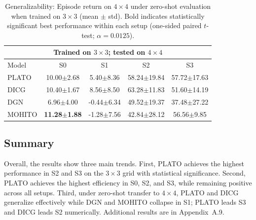 
\begin{table}[t]
\centering
\footnotesize
\setlength{\tabcolsep}{3.2pt}
\renewcommand{\arraystretch}{1.03}
\begin{tabular}{@{}l|c|c|c|c@{}}
\toprule
\multicolumn{5}{c}{Trained on $3\times 3$; tested on $4\times 4$} \\
\midrule
Model  & \multicolumn{1}{c|}{S0} & \multicolumn{1}{c|}{S1} & \multicolumn{1}{c|}{S2} & \multicolumn{1}{c}{S3} \\
\midrule

PLATO & 10.00$\pm$2.68 & 5.40$\pm$8.36 & 58.24$\pm$19.84 & 57.72$\pm$17.63 \\
DICG & 10.40$\pm$1.67 & 8.56$\pm$8.50 & 63.28$\pm$11.83 & 51.60$\pm$14.19 \\
DGN & 6.96$\pm$4.00 & -0.44$\pm$6.34 & 49.52$\pm$19.37 & 37.48$\pm$27.22 \\
MOHITO  & \textbf{11.28$\pm$1.88} & -1.28$\pm$7.56 & 42.84$\pm$28.12 & 56.56$\pm$9.85 \\

\bottomrule
\end{tabular}
\caption{Generalizability: Episode return on $4\times 4$ under zero-shot evaluation 
when trained on $3\times 3$ (mean $\pm$ std). Bold indicates statistically significant 
best performance within each setup (one-sided paired $t$-test; $\alpha=0.0125$).}
\label{tab:cross_4x4_reward_3x3}
\end{table}

\subsection{Summary}\label{sub:exp_summary}
Overall, the results show three main trends. First, PLATO achieves the highest performance in S2 and S3 on the $3\times 3$ grid with statistical significance. Second, PLATO achieves the highest efficiency in S0, S2, and S3, while remaining positive across all setups. Third, under zero-shot transfer to $4\times 4$, PLATO and DICG generalize effectively while DGN and MOHITO collapse in S1; PLATO leads S3 and DICG leads S2 numerically. Additional results are in Appendix~A.9.

